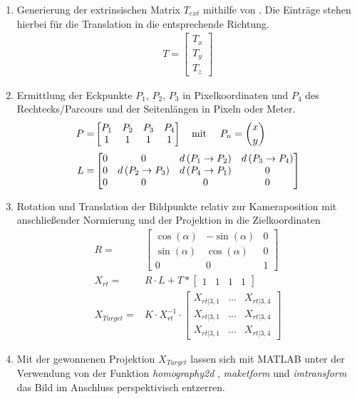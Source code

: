 \begin{enumerate}
	\item Generierung der extrinsischen Matrix $T_{ext}$ mithilfe von \citep{Calib}. Die Einträge stehen hierbei für die Translation in die entsprechende Richtung.
	\begin{align*}
	T = \begin{bmatrix}
	T_x \\ 
	T_y \\ 
	T_z 
	\end{bmatrix}
	\end{align*}  
	\item Ermittlung der Eckpunkte $P_1$, $P_2$, $P_3$ in Pixelkoordinaten und $P_4$ des Rechtecks/Parcours und der Seitenlängen in Pixeln oder Meter. 
	\begin{align*}
	P =& \begin{bmatrix}
	P_1 & P_2 & P_3 & P_4 \\
	1 & 1 & 1 & 1 	  
	\end{bmatrix} \text{\quad mit \quad} P_n = \binom{ x }{ y }\\[1mm]
	L =& \begin{bmatrix}
	0 & 0 & d\left(P_1 \rightarrow P_2 \right) & d\left(P_3 \rightarrow P_4 \right)\\
	0 & d\left(P_2 \rightarrow P_3 \right) & d\left(P_4 \rightarrow P_1 \right) & 0\\
	0 & 0 & 0 & 0 
	\end{bmatrix}	
	\end{align*}
	\item Rotation und Translation der Bildpunkte relativ zur Kameraposition mit anschließender Normierung und der Projektion in die Zielkoordinaten 
	\begin{align*}
	R =& \begin{bmatrix}
	\cos\left(\alpha \right) & -\sin\left(\alpha \right) & 0 \\
	\sin\left(\alpha \right) & \cos\left(\alpha \right) & 0 \\
	0 & 0 & 1 	  
	\end{bmatrix} \\[1mm]
	X_{rt} =& R \cdot L + T * \begin{bmatrix}
	1 & 1 & 1 & 1
	\end{bmatrix} \\[1mm]
	X_{Target} =& K \cdot X_{rt}^{-1} \cdot \begin{bmatrix}
 	X_{rt|3,1} & ... & X_{rt|3,4} \\ 
 	X_{rt|3,1} & ... & X_{rt|3,4} \\
 	X_{rt|3,1} & ... & X_{rt|3,4}
 	\end{bmatrix}	
	\end{align*}
	\item Mit der gewonnenen Projektion $X_{Target}$ lassen sich mit MATLAB unter der Verwendung von der Funktion \textit{homography2d} \cite{Peter}, \textit{maketform} und \textit{imtransform} \cite{Steve} das Bild im Anschluss perspektivisch entzerren.	
\end{enumerate}

